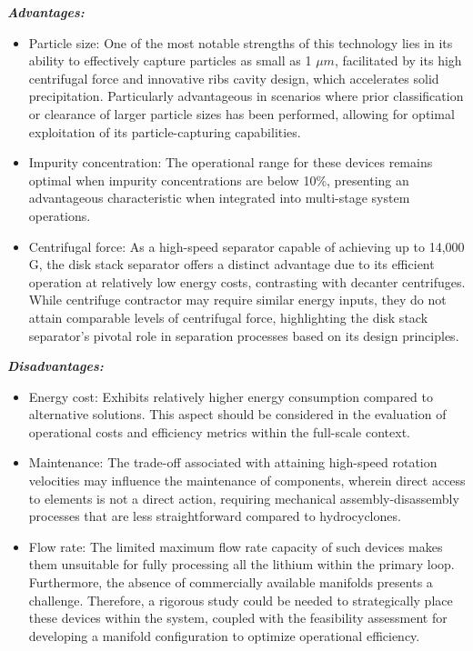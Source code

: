  \begin{tcolorbox}[colback=blue!5!white,enhanced,breakable,colframe=blue!75!black,title=Disck Stack Separator]
		\textbf{\textit{Advantages:}}
	\begin{itemize}
		\item Particle size: One of the most notable strengths of this technology lies in its ability to effectively capture particles as small as 1 $\mu m$, facilitated by its high centrifugal force and innovative ribs cavity design, which accelerates solid precipitation. Particularly advantageous in scenarios where prior classification or clearance of larger particle sizes has been performed, allowing for optimal exploitation of its particle-capturing capabilities.
		\item Impurity concentration: The operational range for these devices remains optimal when impurity concentrations are below 10\%, presenting an advantageous characteristic when integrated into multi-stage system operations.
		\item Centrifugal force: As a high-speed separator capable of achieving up to 14,000 G, the disk stack separator offers a distinct advantage due to its efficient operation at relatively low energy costs, contrasting with decanter centrifuges. While centrifuge contractor may require similar energy inputs, they do not attain comparable levels of centrifugal force, highlighting the disk stack separator's pivotal role in separation processes based on its design principles.
	\end{itemize}
	
	\textbf{\textit{Disadvantages:}}
	
	\begin{itemize}
		\item Energy cost: Exhibits relatively higher energy consumption compared to alternative solutions. This aspect should be considered in the evaluation of operational costs and efficiency metrics within the full-scale context.
		\item Maintenance: The trade-off associated with attaining high-speed rotation velocities may influence the maintenance of components, wherein direct access to elements is not a direct action, requiring mechanical assembly-disassembly processes that are less straightforward compared to hydrocyclones.
		\item Flow rate: The limited maximum flow rate capacity of such devices makes them unsuitable for fully processing all the lithium within the primary loop. Furthermore, the absence of commercially available manifolds presents a challenge. Therefore, a rigorous study could be needed to strategically place these devices within the system, coupled with the feasibility assessment for developing a manifold configuration to optimize operational efficiency.
	\end{itemize}
	

\end{tcolorbox}
